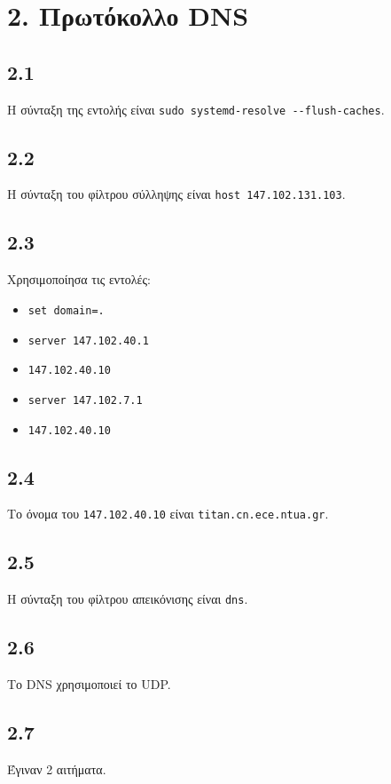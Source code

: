 	\section*{2. Πρωτόκολλο DNS}
	
		\subsection*{2.1} 
			Η σύνταξη της εντολής είναι \verb|sudo systemd-resolve --flush-caches|.

		\subsection*{2.2} 
			Η σύνταξη του φίλτρου σύλληψης είναι \verb|host 147.102.131.103|.

		\subsection*{2.3} 
			Χρησιμοποίησα τις εντολές: 
			
			\begin{itemize}
				\item \verb|set domain=.|
				\item \verb|server 147.102.40.1|
				\item \verb|147.102.40.10|
				\item \verb|server 147.102.7.1|
				\item \verb|147.102.40.10|
			\end{itemize}

		\subsection*{2.4} 
			Το όνομα του \verb|147.102.40.10| είναι \verb|titan.cn.ece.ntua.gr|.
			
		\subsection*{2.5} 
			Η σύνταξη του φίλτρου απεικόνισης είναι \verb|dns|.

		\subsection*{2.6} 
			Το DNS χρησιμοποιεί το UDP.

		\subsection*{2.7} 
			Έγιναν 2 αιτήματα.

